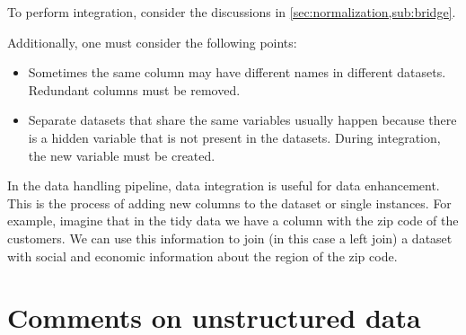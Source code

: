 To perform integration, consider the discussions in \cref{sec:normalization,sub:bridge}.

Additionally, one must consider the following points:
\begin{itemize}
  \item Sometimes the same column may have different names in different datasets.  Redundant
    columns must be removed.
  \item Separate datasets that share the same variables usually happen because there is a
    hidden variable that is not present in the datasets.  During integration, the new
    variable must be created.
\end{itemize}


In the data handling pipeline, data integration is useful for data enhancement.  This is
the process of adding new columns to the dataset or single instances.  For example,
imagine that in the tidy data we have a column with the zip code of the customers.  We can
use this information to join (in this case a left join) a dataset with social and economic
information about the region of the zip code.

\section{Comments on unstructured data}

